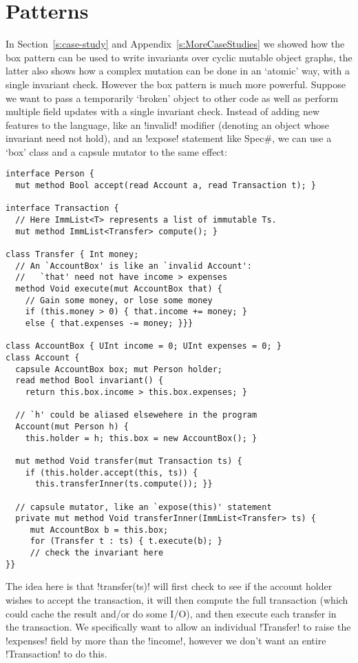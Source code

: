 \section{Patterns}
\label{s:patterns}
In Section~\ref{s:case-study} and Appendix~\ref{s:MoreCaseStudies} we showed how the box pattern can be used to write invariants over cyclic mutable object graphs, the latter also shows how a complex mutation can be done in an `atomic' way, with a single invariant check. However the box pattern is much more powerful. Suppose we want to pass a temporarily `broken' object to other code as well as perform multiple field updates with a single invariant check. 
Instead of adding new features to the language, like an \Q!invalid! modifier (denoting an object whose invariant need not hold), and an \Q!expose! statement like Spec\#, we can use a `box' class and a capsule mutator to the same effect:
\begin{lstlisting}
interface Person {
  mut method Bool accept(read Account a, read Transaction t); }

interface Transaction { 
  // Here ImmList<T> represents a list of immutable Ts.
  mut method ImmList<Transfer> compute(); }

class Transfer { Int money;
  // An `AccountBox' is like an `invalid Account':
  //   `that' need not have income > expenses
  method Void execute(mut AccountBox that) {
    // Gain some money, or lose some money
    if (this.money > 0) { that.income += money; }
    else { that.expenses -= money; }}}

class AccountBox { UInt income = 0; UInt expenses = 0; }
class Account {
  capsule AccountBox box; mut Person holder;
  read method Bool invariant() {
    return this.box.income > this.box.expenses; }

  // `h' could be aliased elsewehere in the program    
  Account(mut Person h) { 
    this.holder = h; this.box = new AccountBox(); }

  mut method Void transfer(mut Transaction ts) {
    if (this.holder.accept(this, ts)) {
	  this.transferInner(ts.compute()); }}

  // capsule mutator, like an `expose(this)' statement
  private mut method Void transferInner(ImmList<Transfer> ts) {
     mut AccountBox b = this.box;
     for (Transfer t : ts) { t.execute(b); }
     // check the invariant here
}}
\end{lstlisting}
The idea here is that \Q!transfer(ts)! will first check to see if the account holder wishes to accept the transaction, it will then compute the full transaction (which could cache the result and/or do some I/O), and then execute each transfer in the transaction. We specifically want to allow an individual \Q!Transfer! to raise the \Q!expenses! field by more than the \Q!income!, however we don't want an entire \Q!Transaction! to do this. 
